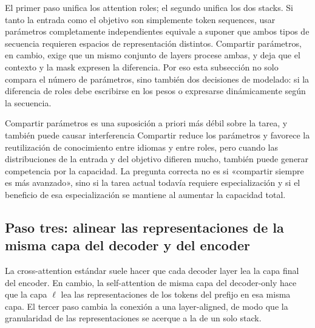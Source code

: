 El primer paso unifica los attention roles; el segundo unifica los dos stacks. Si tanto la entrada como el objetivo son simplemente token sequences, usar parámetros completamente independientes equivale a suponer que ambos tipos de secuencia requieren espacios de representación distintos. Compartir parámetros, en cambio, exige que un mismo conjunto de layers procese ambas, y deja que el contexto y la mask expresen la diferencia. Por eso esta subsección no solo compara el número de parámetros, sino también dos decisiones de modelado: si la diferencia de roles debe escribirse en los pesos o expresarse dinámicamente según la secuencia.



\begin{warningbox}{Compartir parámetros es una suposición a priori más débil sobre la tarea, y también puede causar interferencia}
Compartir reduce los parámetros y favorece la reutilización de conocimiento entre idiomas y entre roles, pero cuando las distribuciones de la entrada y del objetivo difieren mucho, también puede generar competencia por la capacidad. La pregunta correcta no es si «compartir siempre es más avanzado», sino si la tarea actual todavía requiere especialización y si el beneficio de esa especialización se mantiene al aumentar la capacidad total.
\end{warningbox}


\subsection{Paso tres: alinear las representaciones de la misma capa del decoder y del encoder}

La cross-attention estándar suele hacer que cada decoder layer lea la capa final del encoder. En cambio, la self-attention de misma capa del decoder-only hace que la capa $\ell$ lea las representaciones de los tokens del prefijo en esa misma capa. El tercer paso cambia la conexión a una layer-aligned, de modo que la granularidad de las representaciones se acerque a la de un solo stack.

